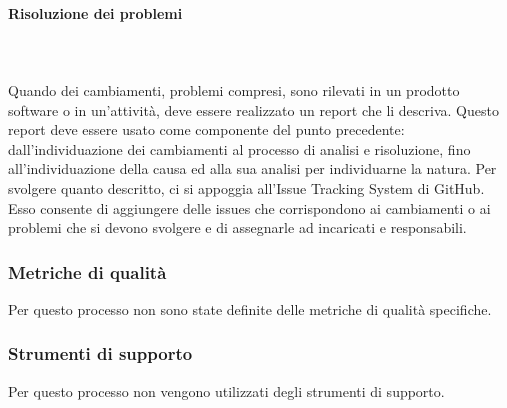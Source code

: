 \paragraph{Risoluzione dei problemi}\mbox{} \\ \mbox{} \\
Quando dei cambiamenti, problemi compresi, sono rilevati in un prodotto software o in un’attività, deve essere realizzato un report che li descriva. Questo report deve essere usato come componente del punto precedente: dall’individuazione dei cambiamenti al processo di analisi e risoluzione, fino all’individuazione della causa ed alla sua analisi per individuarne la natura. Per svolgere quanto descritto, ci si appoggia all’Issue Tracking System di GitHub. Esso consente di aggiungere delle issues che corrispondono ai cambiamenti o ai problemi che si devono svolgere e di assegnarle ad incaricati e responsabili.

\subsubsection{Metriche di qualità}
Per questo processo non sono state definite delle metriche di qualità specifiche.

\subsubsection{Strumenti di supporto}
Per questo processo non vengono utilizzati degli strumenti di supporto.
